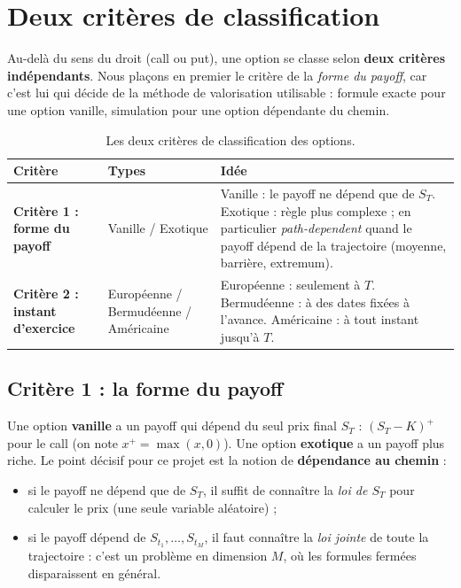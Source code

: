 \section{Deux critères de classification}

Au-delà du sens du droit (call ou put), une option se classe selon \textbf{deux critères indépendants}. Nous plaçons en premier le critère de la \emph{forme du payoff}, car c'est lui qui décide de la méthode de valorisation utilisable : formule exacte pour une option vanille, simulation pour une option dépendante du chemin.

\begin{table}[H]
\centering\small
\begin{tabularx}{\textwidth}{>{\bfseries}p{3.4cm}p{3.6cm}L}
\toprule
Critère & Types & Idée \\
\midrule
Critère 1 : forme du payoff & Vanille / Exotique & Vanille : le payoff ne dépend que de $S_T$. Exotique : règle plus complexe ; en particulier \emph{path-dependent} quand le payoff dépend de la trajectoire (moyenne, barrière, extremum). \\
Critère 2 : instant d'exercice & Européenne / Bermudéenne / Américaine & Européenne : seulement à $T$. Bermudéenne : à des dates fixées à l'avance. Américaine : à tout instant jusqu'à $T$. \\
\bottomrule
\end{tabularx}
\caption{Les deux critères de classification des options.}
\label{tab:criteres}
\end{table}

\subsection{Critère 1 : la forme du payoff}

Une option \textbf{vanille} a un payoff qui dépend du seul prix final $S_T$ : $(S_T-K)^+$ pour le call (on note $x^+ = \max(x,0)$). Une option \textbf{exotique} a un payoff plus riche. Le point décisif pour ce projet est la notion de \textbf{dépendance au chemin} :
\begin{itemize}[nosep]
\item si le payoff ne dépend que de $S_T$, il suffit de connaître la \emph{loi de $S_T$} pour calculer le prix (une seule variable aléatoire) ;
\item si le payoff dépend de $S_{t_1},\dots,S_{t_M}$, il faut connaître la \emph{loi jointe} de toute la trajectoire : c'est un problème en dimension $M$, où les formules fermées disparaissent en général.
\end{itemize}

